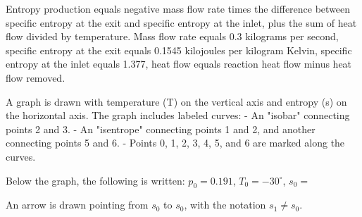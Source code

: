 Entropy production equals negative mass flow rate times the difference between specific entropy at the exit and specific entropy at the inlet, plus the sum of heat flow divided by temperature.  
Mass flow rate equals 0.3 kilograms per second, specific entropy at the exit equals 0.1545 kilojoules per kilogram Kelvin, specific entropy at the inlet equals 1.377, heat flow equals reaction heat flow minus heat flow removed.

A graph is drawn with temperature (T) on the vertical axis and entropy (s) on the horizontal axis. The graph includes labeled curves:  
- An "isobar" connecting points 2 and 3.  
- An "isentrope" connecting points 1 and 2, and another connecting points 5 and 6.  
- Points 0, 1, 2, 3, 4, 5, and 6 are marked along the curves.  

Below the graph, the following is written:  
\( p_0 = 0.191 \), \( T_0 = -30^\circ \), \( s_0 = \)  

An arrow is drawn pointing from \( s_0 \) to \( s_0 \), with the notation \( s_1 \neq s_0 \).